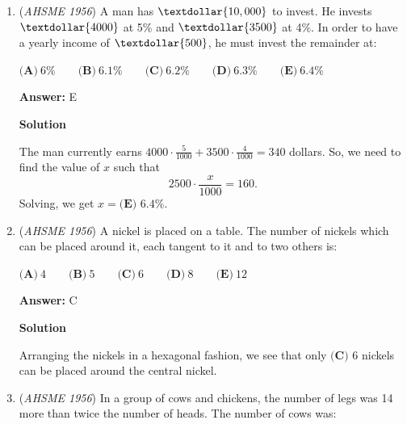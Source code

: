 \begin{enumerate}
 $\textbf{(A)}\ 587 * 10^8\text{ miles}\qquad \textbf{(B)}\ 587 * 10^{10}\text{ miles}\qquad \textbf{(C)}\ 587*10^{-10}\text{ miles} \\ \textbf{(D)}\ 587 * 10^{12} \text{ miles} \qquad \textbf{(E)}\ 587* 10^{ - 12} \text{ miles}$

 \textbf{Answer: }D



\textbf{Solution}

The distance light travels in one year can also be written as $587\cdot10^{10}$. In 100 years, light will travel $(587\cdot10^{10})\cdot100=587\cdot10^{12}$.

 Therefore, our answer is  $\boxed{\textbf{(D) }587\cdot10^{12}}$.

 


	\item (\textit{AHSME 1956}) A man has $\textdollar{10,000 }$ to invest. He invests $\textdollar{4000}$ at 5\% and $\textdollar{3500}$ at 4\%. 
In order to have a yearly income of $\textdollar{500}$, he must invest the remainder at: 


 $\textbf{(A)}\ 6\%\qquad\textbf{(B)}\ 6.1\%\qquad\textbf{(C)}\ 6.2\%\qquad\textbf{(D)}\ 6.3\%\qquad\textbf{(E)}\ 6.4\%$

 \textbf{Answer: }E



\textbf{Solution}

The man currently earns $4000 \cdot \frac{5}{1000} + 3500 \cdot \frac{4}{1000} = 340$ dollars. So, we need to find the value of $x$ such that
 \[2500 \cdot \frac{x}{1000} = 160.\]Solving, we get $x = \boxed{\textbf{(E) }6.4\%.}$



	\item (\textit{AHSME 1956}) A nickel is placed on a table. The number of nickels which can be placed around it, each tangent to it and to two others is: 


 $\textbf{(A)}\ 4 \qquad\textbf{(B)}\ 5 \qquad\textbf{(C)}\ 6 \qquad\textbf{(D)}\ 8 \qquad\textbf{(E)}\ 12$

 \textbf{Answer: }C



\textbf{Solution}

Arranging the nickels in a hexagonal fashion, we see that only $\boxed{\textbf{(C) }6}$ nickels can be placed around the central nickel.

 


	\item (\textit{AHSME 1956}) In a group of cows and chickens, the number of legs was 14 more than twice the number of heads. The number of cows was: 



\end{enumerate}
